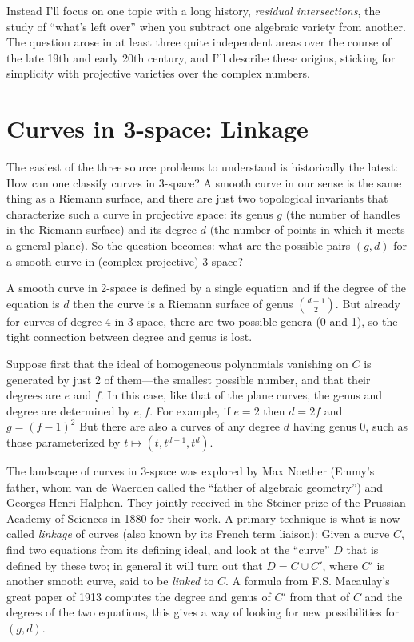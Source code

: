 \documentclass[11pt, oneside]{article}   	%
\begin{document}
Instead I'll focus on one topic with a long history, \emph{residual intersections}, the study of ``what's left over'' when you subtract one algebraic variety from another. The question arose in at least three quite independent areas over the course of the late 19th and early 20th century, and I'll describe these origins, sticking for simplicity with projective varieties over the complex numbers.

\section{Curves in 3-space: Linkage} The easiest of the three source problems to understand is historically the latest: How can one classify curves in 3-space? A smooth curve in our sense is the same thing as a Riemann surface, and there are just two topological invariants that characterize such a curve in projective space: its genus $g$ (the number of handles in the Riemann surface) and its degree $d$ (the number of points in which it meets a general plane). So the question becomes: what are the possible pairs $(g,d)$ for a smooth curve in (complex projective) 3-space?

A  smooth curve in 2-space is defined by a single equation and if the degree of the equation is $d$ then the curve is a Riemann surface of genus $d-1\choose 2$.
But already for curves of degree 4 in 3-space, there are two possible genera (0 and 1), so the tight connection between degree and genus is lost.

Suppose first that the ideal of homogeneous polynomials vanishing on $C$ is generated by just 2 of them---the smallest possible number, and that their degrees are $e$ and $f$. In this case,
like that of the plane curves, the genus and degree are determined by $e,f$. For example,
if $e=2$ then $d = 2f$ and $g = (f-1)^{2}$ But there are also a curves of any degree $d$ having genus 0, such as those parameterized by $t \mapsto (t, t^{d-1}, t^{d})$. 

The landscape of curves in 3-space was explored by 
Max Noether (Emmy's father, whom van de Waerden called the ``father of algebraic geometry'') and Georges-Henri Halphen. They jointly received in the Steiner prize of the Prussian Academy of Sciences in 1880 for their work. A primary technique is what is now called \emph{linkage} of curves (also known by its French term liaison):  Given a curve $C$, find two equations from its defining ideal, and look at the ``curve'' $D$ that is defined by these two; in general it will turn out that $D = C\cup C'$, where $C'$ is another smooth curve, said to be \emph{linked} to $C$. A formula from F.S. Macaulay's great paper
of 1913 computes the degree and genus
of $C'$ from that of $C$ and the degrees of the two equations, this gives a way of looking for
new possibilities for $(g,d)$.
\end{document}

